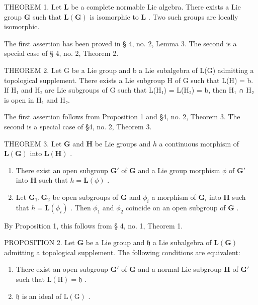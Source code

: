 THEOREM 1. Let \(\mathbf{L}\) be a complete normable Lie algebra. There exists a Lie group \(\mathbf{G}\) such that \(\mathbf{L}(\mathbf{G})\) is isomorphic to \(\mathbf{L}\) . Two such groups are locally isomorphic.

The first assertion has been proved in § 4, no. 2, Lemma 3. The second is a special case of § 4, no. 2, Theorem 2.

THEOREM 2. Let G be a Lie group and b a Lie subalgebra of L(G) admitting a topological supplement. There exists a Lie subgroup H of G such that L(H) = b. If H₁ and H₂ are Lie subgroups of G such that L(H₁) = L(H₂) = b, then H₁ ∩ H₂ is open in H₁ and H₂.

The first assertion follows from Proposition 1 and §4, no. 2, Theorem 3. The second is a special case of §4, no. 2, Theorem 3.

THEOREM 3. Let \(\mathbf{G}\) and \(\mathbf{H}\) be Lie groups and \(h\) a continuous morphism of \(\mathbf{L}(\mathbf{G})\) into \(\mathbf{L}(\mathbf{H})\) .

\begin{enumerate}
\def\labelenumi{(\roman{enumi})}
\item
  There exist an open subgroup \(\mathbf{G}'\) of \(\mathbf{G}\) and a Lie group morphism \(\phi\) of \(\mathbf{G}'\) into \(\mathbf{H}\) such that \(h = \mathbf{L}(\phi)\) .
\item
  Let \(\mathbf{G}_1, \mathbf{G}_2\) be open subgroups of \(\mathbf{G}\) and \(\phi_i\) a morphism of \(\mathbf{G}_i\) into \(\mathbf{H}\) such that \(h = \mathbf{L}(\phi_i)\) . Then \(\phi_1\) and \(\phi_2\) coincide on an open subgroup of \(\mathbf{G}\) .
\end{enumerate}

By Proposition 1, this follows from § 4, no. 1, Theorem 1.

PROPOSITION 2. Let \(\mathbf{G}\) be a Lie group and \(\mathfrak{h}\) a Lie subalgebra of \(\mathbf{L}(\mathbf{G})\) admitting a topological supplement. The following conditions are equivalent:

\begin{enumerate}
\def\labelenumi{(\roman{enumi})}
\item
  There exist an open subgroup \(\mathbf{G}'\) of \(\mathbf{G}\) and a normal Lie subgroup \(\mathbf{H}\) of \(\mathbf{G}'\) such that \(\mathrm{L(H)} = \mathfrak{h}\) .
\item
  \(\mathfrak{h}\) is an ideal of \(\mathrm{L}(\mathrm{G})\) .
\end{enumerate}

